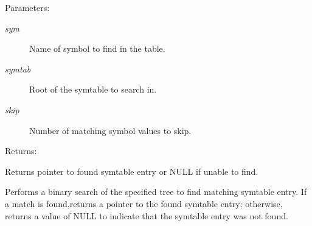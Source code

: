 \begin{Desc}
\item[Parameters: ]\par
\begin{description}
\item[{\em 
sym}]Name of symbol to find in the table. \item[{\em 
symtab}]Root of the symtable to search in. \item[{\em 
skip}]Number of matching symbol values to skip.\end{description}
\end{Desc}
\begin{Desc}
\item[Returns: ]\par
Returns pointer to found symtable entry or NULL if unable to find.\end{Desc}
Performs a binary search of the specified tree to find matching symtable entry. If a match is found,returns a pointer to the found symtable entry; otherwise, returns a value of NULL to indicate that the symtable entry was not found. 